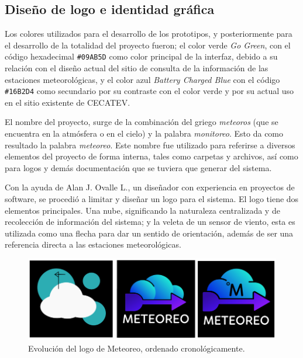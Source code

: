 \pagebreak

\subsection{Diseño de logo e identidad gráfica}

Los colores utilizados para el desarrollo de los prototipos, y posteriormente para el desarrollo de la totalidad del proyecto fueron; el color verde \textit{Go Green}, con el código hexadecimal \texttt{\#09AB5D} como color principal de la interfaz, debido a su relación con el diseño actual del sitio de consulta de la información de las estaciones meteorológicas, y el color azul \textit{Battery Charged Blue} con el código \texttt{\#16B2D4} como secundario por su contraste con el color verde y por su actual uso en el sitio existente de CECATEV.

El nombre del proyecto, surge de la combinación del griego \textit{meteoros} (que se encuentra en la atmósfera o en el cielo) y la palabra \textit{monitoreo}. Esto da como resultado la palabra \textit{meteoreo}. Este nombre fue utilizado para referirse a diversos elementos del proyecto de forma interna, tales como carpetas y archivos, así como para logos y demás documentación que se tuviera que generar del sistema.

Con la ayuda de Alan J. Ovalle L., un diseñador con experiencia en proyectos de software, se procedió a limitar y diseñar un logo para el sistema. El logo tiene dos elementos principales. Una nube, significando la naturaleza centralizada y de recolección de información del sistema; y la veleta de un sensor de viento, esta es utilizada como una flecha para dar un sentido de orientación, además de ser una referencia directa a las estaciones meteorológicas.

\begin{figure}[!ht]
	\centering
	\includegraphics[width=1\linewidth]{images/logos/evolution.png}
	\caption{Evolución del logo de Meteoreo, ordenado cronológicamente.}
	\label{fig:logo_evolution}
\end{figure}

